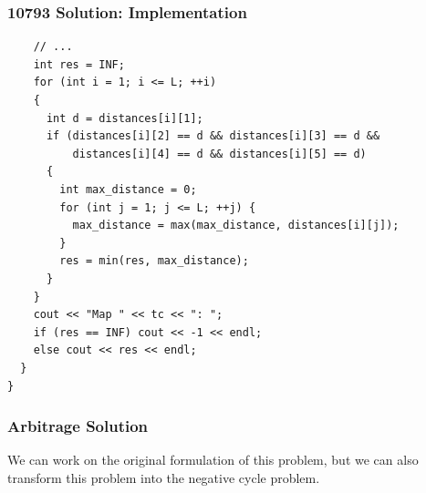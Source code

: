 \documentclass{beamer}
\begin{document}
\begin{frame}[containsverbatim]
\frametitle{10793 Solution: Implementation}

\scriptsize
\begin{lstlisting}
    // ...
    int res = INF;
    for (int i = 1; i <= L; ++i)
    {
      int d = distances[i][1];
      if (distances[i][2] == d && distances[i][3] == d &&
          distances[i][4] == d && distances[i][5] == d)
      {
        int max_distance = 0;
        for (int j = 1; j <= L; ++j) {
          max_distance = max(max_distance, distances[i][j]);
        }
        res = min(res, max_distance);
      }
    }
    cout << "Map " << tc << ": ";
    if (res == INF) cout << -1 << endl;
    else cout << res << endl;
  }
}
\end{lstlisting}

\end{frame}

\begin{frame}%
\frametitle{Arbitrage Solution}

We can work on the original formulation of this problem, but we can also transform this problem into the negative cycle problem.


\end{frame}
\end{document}
